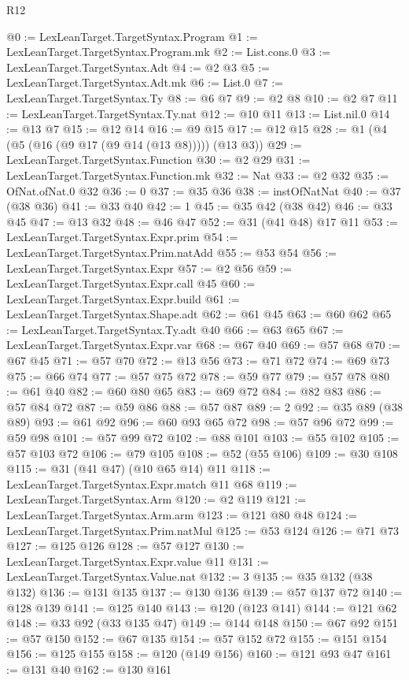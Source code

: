 \begin{lexlean}{R12}
\begin{coremodule}
@0 := LexLeanTarget.TargetSyntax.Program
@1 := LexLeanTarget.TargetSyntax.Program.mk
@2 := List.cons.{0}
@3 := LexLeanTarget.TargetSyntax.Adt
@4 := @2 @3
@5 := LexLeanTarget.TargetSyntax.Adt.mk
@6 := List.{0}
@7 := LexLeanTarget.TargetSyntax.Ty
@8 := @6 @7
@9 := @2 @8
@10 := @2 @7
@11 := LexLeanTarget.TargetSyntax.Ty.nat
@12 := @10 @11
@13 := List.nil.{0}
@14 := @13 @7
@15 := @12 @14
@16 := @9 @15
@17 := @12 @15
@28 := @1 (@4 (@5 (@16 (@9 @17 (@9 @14 (@13 @8))))) (@13 @3))
@29 := LexLeanTarget.TargetSyntax.Function
@30 := @2 @29
@31 := LexLeanTarget.TargetSyntax.Function.mk
@32 := Nat
@33 := @2 @32
@35 := OfNat.ofNat.{0} @32
@36 := 0
@37 := @35 @36
@38 := instOfNatNat
@40 := @37 (@38 @36)
@41 := @33 @40
@42 := 1
@45 := @35 @42 (@38 @42)
@46 := @33 @45
@47 := @13 @32
@48 := @46 @47
@52 := @31 (@41 @48) @17 @11
@53 := LexLeanTarget.TargetSyntax.Expr.prim
@54 := LexLeanTarget.TargetSyntax.Prim.natAdd
@55 := @53 @54
@56 := LexLeanTarget.TargetSyntax.Expr
@57 := @2 @56
@59 := LexLeanTarget.TargetSyntax.Expr.call @45
@60 := LexLeanTarget.TargetSyntax.Expr.build
@61 := LexLeanTarget.TargetSyntax.Shape.adt
@62 := @61 @45
@63 := @60 @62
@65 := LexLeanTarget.TargetSyntax.Ty.adt @40
@66 := @63 @65
@67 := LexLeanTarget.TargetSyntax.Expr.var
@68 := @67 @40
@69 := @57 @68
@70 := @67 @45
@71 := @57 @70
@72 := @13 @56
@73 := @71 @72
@74 := @69 @73
@75 := @66 @74
@77 := @57 @75 @72
@78 := @59 @77
@79 := @57 @78
@80 := @61 @40
@82 := @60 @80 @65
@83 := @69 @72
@84 := @82 @83
@86 := @57 @84 @72
@87 := @59 @86
@88 := @57 @87
@89 := 2
@92 := @35 @89 (@38 @89)
@93 := @61 @92
@96 := @60 @93 @65 @72
@98 := @57 @96 @72
@99 := @59 @98
@101 := @57 @99 @72
@102 := @88 @101
@103 := @55 @102
@105 := @57 @103 @72
@106 := @79 @105
@108 := @52 (@55 @106)
@109 := @30 @108
@115 := @31 (@41 @47) (@10 @65 @14) @11
@118 := LexLeanTarget.TargetSyntax.Expr.match @11 @68
@119 := LexLeanTarget.TargetSyntax.Arm
@120 := @2 @119
@121 := LexLeanTarget.TargetSyntax.Arm.arm
@123 := @121 @80 @48
@124 := LexLeanTarget.TargetSyntax.Prim.natMul
@125 := @53 @124
@126 := @71 @73
@127 := @125 @126
@128 := @57 @127
@130 := LexLeanTarget.TargetSyntax.Expr.value @11
@131 := LexLeanTarget.TargetSyntax.Value.nat
@132 := 3
@135 := @35 @132 (@38 @132)
@136 := @131 @135
@137 := @130 @136
@139 := @57 @137 @72
@140 := @128 @139
@141 := @125 @140
@143 := @120 (@123 @141)
@144 := @121 @62
@148 := @33 @92 (@33 @135 @47)
@149 := @144 @148
@150 := @67 @92
@151 := @57 @150
@152 := @67 @135
@154 := @57 @152 @72
@155 := @151 @154
@156 := @125 @155
@158 := @120 (@149 @156)
@160 := @121 @93 @47
@161 := @131 @40
@162 := @130 @161

\end{coremodule}
\end{lexlean}
